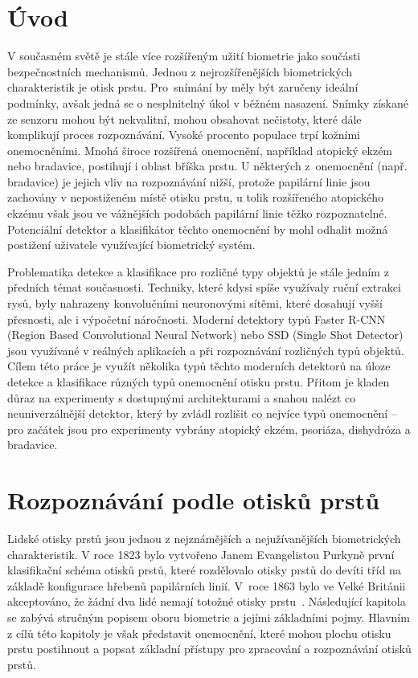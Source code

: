 
\chapter{Úvod}
V současném světě je stále více rozšířeným užití biometrie jako součásti bezpečnostních mechanismů. Jednou z nejrozšířenějších biometrických charakteristik je otisk prstu. Pro~snímání by měly být zaručeny ideální podmínky, avšak jedná se o nesplnitelný úkol v běžném nasazení. Snímky získané ze senzoru mohou být nekvalitní, mohou obsahovat nečistoty, které dále komplikují proces rozpoznávání. Vysoké procento populace trpí kožními onemocněními. Mnohá široce rozšířená onemocnění, například atopický ekzém nebo bradavice, postihují i oblast bříška prstu. U některých z~onemocnění (např. bradavice) je jejich vliv na rozpoznávání nižší, protože papilární linie jsou zachovány v nepostiženém místě otisku prstu, u tolik rozšířeného atopického ekzému však jsou ve vážnějších podobách papilární linie těžko rozpoznatelné. Potenciální detektor a klasifikátor těchto onemocnění by mohl odhalit možná postižení uživatele využívající biometrický systém.

Problematika detekce a klasifikace pro rozličné typy objektů je stále jedním z předních témat současnosti. Techniky, které kdysi spíše využívaly ruční extrakci rysů, byly nahrazeny konvolučními neuronovými sítěmi, které dosahují vyšší přesnosti, ale i výpočetní náročnosti. Moderní detektory typů Faster R-CNN (Region Based Convolutional Neural Network) nebo SSD (Single Shot Detector) jsou využívané v reálných aplikacích a při rozpoznávání rozličných typů objektů. Cílem této práce je využít několika typů těchto moderních detektorů na úloze detekce a klasifikace různých typů onemocnění otisku prstu. Přitom je kladen důraz na experimenty s dostupnými architekturami a snahou nalézt co neuniverzálnější detektor, který by zvládl rozlišit co nejvíce typů onemocnění -- pro začátek jsou pro experimenty vybrány atopický ekzém, psoriáza, dishydróza a bradavice.
\chapter{Rozpoznávání podle otisků prstů}
Lidské otisky prstů jsou jednou z nejznámějších a nejužívanějších biometrických charakteristik. V roce 1823 bylo vytvořeno Janem Evangelistou Purkyně první klasifikační schéma otisků prstů, které rozdělovalo otisky prstů do devíti tříd na základě konfigurace hřebenů papilárních linií. V~roce 1863 bylo ve Velké Británii akceptováno, že žádní dva lidé nemají totožné otisky prstu~\cite{Maltoni2009}. Následující kapitola se zabývá stručným popisem oboru biometrie a jejími základními pojmy. Hlavním z cílů této kapitoly je však představit onemocnění, které mohou plochu otisku prstu postihnout a popsat základní přístupy pro zpracování a rozpoznávání otisků prstů.

